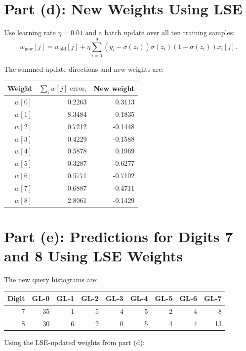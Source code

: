 \documentclass[11pt]{article}
\begin{document}
\section*{Part (d): New Weights Using LSE}

Use learning rate \(\eta=0.01\) and a batch update over all ten training samples:
\[
    w_{\text{new}}[j]
    =
    w_{\text{old}}[j]
    +
    \eta\sum_{i=0}^{9}
    (y_i-\sigma(z_i))\sigma(z_i)(1-\sigma(z_i))x_i[j].
\]

The summed update directions and new weights are:

\begin{center}
\begin{tabular}{rrr}
\toprule
Weight & \(\sum_i w[j]\text{ error}_i\) & New weight \\
\midrule
\(w[0]\) & 0.2263 & 0.3113 \\
\(w[1]\) & 8.3484 & 0.1835 \\
\(w[2]\) & 0.7212 & -0.1448 \\
\(w[3]\) & 0.4229 & -0.1588 \\
\(w[4]\) & 0.5878 & 0.1969 \\
\(w[5]\) & 0.3287 & -0.6277 \\
\(w[6]\) & 0.5771 & -0.7102 \\
\(w[7]\) & 0.6887 & -0.4711 \\
\(w[8]\) & 2.8061 & -0.1429 \\
\bottomrule
\end{tabular}
\end{center}

\section*{Part (e): Predictions for Digits 7 and 8 Using LSE Weights}

The new query histograms are:

\begin{center}
\begin{tabular}{rrrrrrrrr}
\toprule
Digit & GL-0 & GL-1 & GL-2 & GL-3 & GL-4 & GL-5 & GL-6 & GL-7 \\
\midrule
7 & 35 & 1 & 5 & 4 & 5 & 2 & 4 & 8 \\
8 & 30 & 6 & 2 & 0 & 5 & 4 & 4 & 13 \\
\bottomrule
\end{tabular}
\end{center}

Using the LSE-updated weights from part (d):
\end{document}
